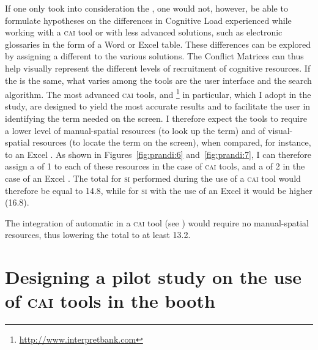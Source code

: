 \documentclass[output=paper]{langsci/langscibook}
\begin{document}
If one only took into consideration the , one would not, however, be able to formulate hypotheses on the differences in Cognitive Load experienced while working with a \textsc{cai} tool or with less advanced  solutions, such as electronic glossaries in the form of a Word or Excel table. These differences can be explored by assigning a different  to the various  solutions. The Conflict Matrices can thus help visually represent the different levels of recruitment of cognitive resources. If the  is the same, what varies among the tools are the user interface and the search algorithm. The most advanced \textsc{cai} tools, and \footnote{\url{http://www.interpretbank.com}} in particular, which I adopt in the study, are designed to yield the most accurate results and to facilitate the user in identifying the term needed on the screen. I therefore expect the tools to require a lower level of manual-spatial resources (to look up the term) and of visual-spatial resources (to locate the term on the screen), when compared, for instance, to an Excel . As shown in Figures~\ref{fig:prandi:6} and~\ref{fig:prandi:7}, I can therefore assign a  of 1 to each of these resources in the case of \textsc{cai} tools, and a  of 2 in the case of an Excel . The total  for \textsc{si} performed during the use of a \textsc{cai} tool would therefore be equal to 14.8, while for \textsc{si} with the use of an Excel  it would be higher (16.8).

The integration of automatic  in a \textsc{cai} tool (see \citealp{Fantinuoli2017b}) would require no manual-spatial resources, thus lowering the total  to at least 13.2.

\section{Designing a pilot study on the use of \textsc{cai} tools in the booth}\label{sec:prandi:3}
\end{document}

